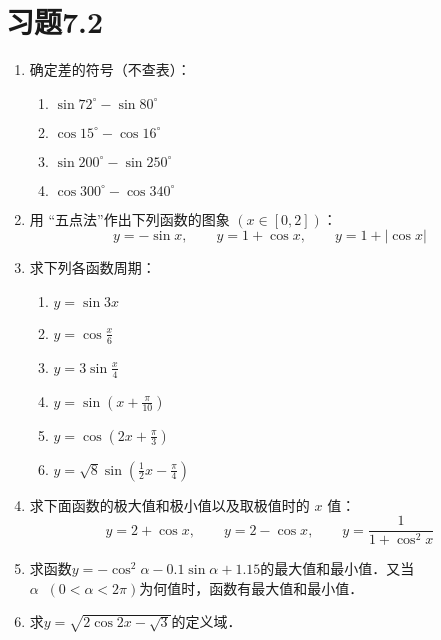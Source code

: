 \section*{习题7.2}
\begin{enumerate}
    \item 确定差的符号（不查表）：
 \begin{multicols}{2}
\begin{enumerate}
    \item     $\sin 72^{\circ}-\sin 80^{\circ}$
    \item  $\cos 15^{\circ}-\cos 16^{\circ}$
    \item  $\sin 200^{\circ}-\sin 250^{\circ}$
    \item  $\cos 300^{\circ}-\cos 340^{\circ}$
\end{enumerate}
 \end{multicols}

 \item 用 “五点法”作出下列函数的图象 $(x \in [0,2])$：
$$y=-\sin x,     \qquad y=1+\cos x,\qquad  y=1+|\cos x|$$


\item 求下列各函数周期：
\begin{multicols}{2}
\begin{enumerate}
    \item $y=\sin 3 x$
    \item $y=\cos \frac{x}{6}$
    \item $y=3 \sin \frac{x}{4}$
    \item $y=\sin \left(x+\frac{\pi}{10}\right)$
    \item $y=\cos \left(2 x+\frac{\pi}{3}\right)$
    \item $y=\sqrt{8} \sin \left(\frac{1}{2} x-\frac{\pi}{4}\right) $
\end{enumerate}
\end{multicols}

    
    \item 求下面函数的极大值和极小值以及取极值时的 $x$ 值：
    $$ y=2+\cos x, \qquad y=2-\cos x,\qquad y=\frac{1}{1+\cos^2 x}$$

\item 求函数$y=-\cos^2\alpha -0.1\sin\alpha+1.15$的最大值和最小值．又当
$\alpha\;\; (0<\alpha<2\pi)$为何值时，函数有最大值和最小值．

\item 求$y=\sqrt{2\cos 2x-\sqrt{3}}$的定义域．

\end{enumerate}

